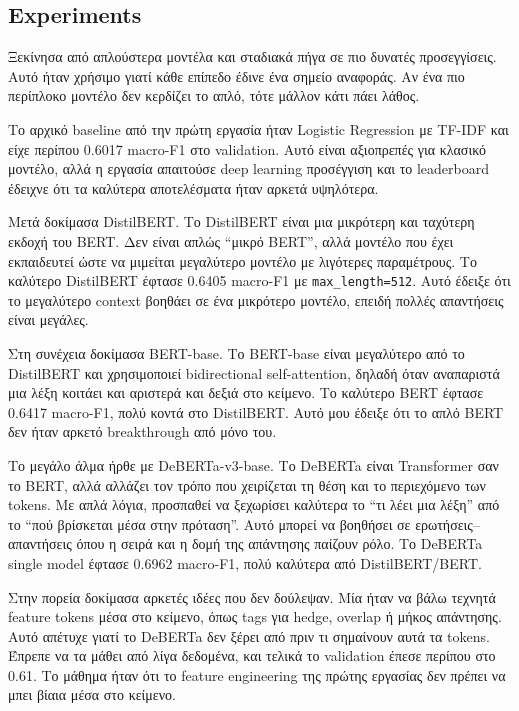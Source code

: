 \documentclass[12pt]{fphw}
\begin{document}
\subsection{Experiments}

Ξεκίνησα από απλούστερα μοντέλα και σταδιακά πήγα σε πιο δυνατές προσεγγίσεις. Αυτό ήταν χρήσιμο γιατί κάθε επίπεδο έδινε ένα σημείο αναφοράς. Αν ένα πιο περίπλοκο μοντέλο δεν κερδίζει το απλό, τότε μάλλον κάτι πάει λάθος.

Το αρχικό baseline από την πρώτη εργασία ήταν Logistic Regression με TF-IDF και είχε περίπου 0.6017 macro-F1 στο validation. Αυτό είναι αξιοπρεπές για κλασικό μοντέλο, αλλά η εργασία απαιτούσε deep learning προσέγγιση και το leaderboard έδειχνε ότι τα καλύτερα αποτελέσματα ήταν αρκετά υψηλότερα.

Μετά δοκίμασα DistilBERT. Το DistilBERT είναι μια μικρότερη και ταχύτερη εκδοχή του BERT. Δεν είναι απλώς ``μικρό BERT'', αλλά μοντέλο που έχει εκπαιδευτεί ώστε να μιμείται μεγαλύτερο μοντέλο με λιγότερες παραμέτρους. Το καλύτερο DistilBERT έφτασε 0.6405 macro-F1 με \texttt{max\_length=512}. Αυτό έδειξε ότι το μεγαλύτερο context βοηθάει σε ένα μικρότερο μοντέλο, επειδή πολλές απαντήσεις είναι μεγάλες.

Στη συνέχεια δοκίμασα BERT-base. Το BERT-base είναι μεγαλύτερο από το DistilBERT και χρησιμοποιεί bidirectional self-attention, δηλαδή όταν αναπαριστά μια λέξη κοιτάει και αριστερά και δεξιά στο κείμενο. Το καλύτερο BERT έφτασε 0.6417 macro-F1, πολύ κοντά στο DistilBERT. Αυτό μου έδειξε ότι το απλό BERT δεν ήταν αρκετό breakthrough από μόνο του.

Το μεγάλο άλμα ήρθε με DeBERTa-v3-base. Το DeBERTa είναι Transformer σαν το BERT, αλλά αλλάζει τον τρόπο που χειρίζεται τη θέση και το περιεχόμενο των tokens. Με απλά λόγια, προσπαθεί να ξεχωρίσει καλύτερα το ``τι λέει μια λέξη'' από το ``πού βρίσκεται μέσα στην πρόταση''. Αυτό μπορεί να βοηθήσει σε ερωτήσεις--απαντήσεις όπου η σειρά και η δομή της απάντησης παίζουν ρόλο. Το DeBERTa single model έφτασε 0.6962 macro-F1, πολύ καλύτερα από DistilBERT/BERT.

Στην πορεία δοκίμασα αρκετές ιδέες που δεν δούλεψαν. Μία ήταν να βάλω τεχνητά feature tokens μέσα στο κείμενο, όπως tags για hedge, overlap ή μήκος απάντησης. Αυτό απέτυχε γιατί το DeBERTa δεν ξέρει από πριν τι σημαίνουν αυτά τα tokens. Έπρεπε να τα μάθει από λίγα δεδομένα, και τελικά το validation έπεσε περίπου στο 0.61. Το μάθημα ήταν ότι το feature engineering της πρώτης εργασίας δεν πρέπει να μπει βίαια μέσα στο κείμενο.
\end{document}
